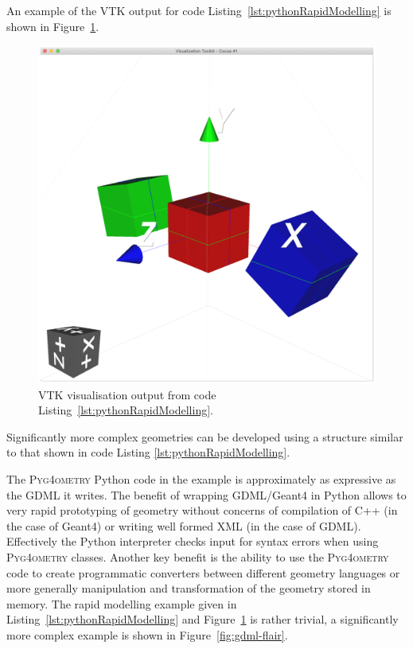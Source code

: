 \documentclass[final,5p,times,twocolumn]{elsarticle}
\newcommand{\PYGEOMETRY}{\textsc{Pyg4ometry}}
\begin{document}
An example of the VTK output for code Listing~\ref{lst:pythonRapidModelling} is shown in 
Figure~\ref{fig:rapidModellingExample}.
\begin{figure}[htbp]
\begin{center}
\includegraphics[width=0.9\columnwidth]{./diagrams/rapidModelling.pdf}
\caption{VTK visualisation output from code Listing~\ref{lst:pythonRapidModelling}.}
\label{fig:rapidModellingExample}
\end{center}
\end{figure}
Significantly more complex geometries can be developed using a structure similar to 
that shown in code Listing \ref{lst:pythonRapidModelling}. 

The \PYGEOMETRY{} Python code in the example is approximately as expressive 
as the GDML it writes. The benefit of wrapping GDML/Geant4 in Python allows 
to very rapid prototyping of geometry without concerns of compilation of C++ (in the 
case of Geant4) or writing well formed XML (in the case of GDML). Effectively
the Python interpreter checks input for syntax errors when using \PYGEOMETRY{} classes. 
Another key benefit is the ability to use the \PYGEOMETRY{} code to create 
programmatic converters between different geometry languages or more generally 
manipulation and transformation of the geometry stored in memory. The rapid modelling 
example given in Listing~\ref{lst:pythonRapidModelling} and Figure~\ref{fig:rapidModellingExample} 
is rather trivial, a significantly more complex example is shown in Figure~\ref{fig:gdml-flair}.
\end{document}
